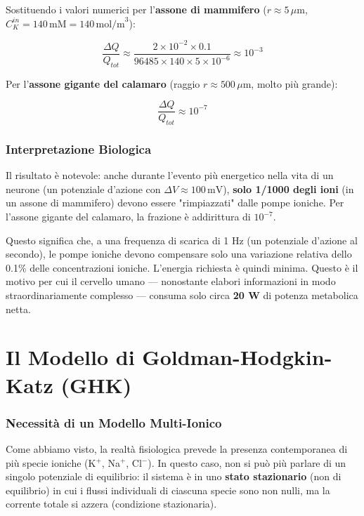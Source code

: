 Sostituendo i valori numerici per l'\textbf{assone di mammifero} ($r \approx 5\,\mu\text{m}$, $C_K^{in} = 140\,\text{mM} = 140\,\text{mol/m}^3$):

\begin{equation}
\frac{\Delta Q}{Q_{tot}} \approx \frac{2 \times 10^{-2} \times 0.1}{96485 \times 140 \times 5 \times 10^{-6}} \approx 10^{-3}
\end{equation}

Per l'\textbf{assone gigante del calamaro} (raggio $r \approx 500\,\mu\text{m}$, molto più grande):

\begin{equation}
\frac{\Delta Q}{Q_{tot}} \approx 10^{-7}
\end{equation}

\subsubsection{Interpretazione Biologica}

Il risultato è notevole: anche durante l'evento più energetico nella vita di un neurone (un potenziale d'azione con $\Delta V \approx 100\,\text{mV}$), \textbf{solo 1/1000 degli ioni} (in un assone di mammifero) devono essere "rimpiazzati" dalle pompe ioniche. Per l'assone gigante del calamaro, la frazione è addirittura di $10^{-7}$.

Questo significa che, a una frequenza di scarica di 1 Hz (un potenziale d'azione al secondo), le pompe ioniche devono compensare solo una variazione relativa dello 0.1\% delle concentrazioni ioniche. L'energia richiesta è quindi minima. Questo è il motivo per cui il cervello umano — nonostante elabori informazioni in modo straordinariamente complesso — consuma solo circa \textbf{20 W} di potenza metabolica netta.


\section{Il Modello di Goldman-Hodgkin-Katz (GHK)}

\subsubsection{Necessità di un Modello Multi-Ionico}

Come abbiamo visto, la realtà fisiologica prevede la presenza contemporanea di più specie ioniche (K$^+$, Na$^+$, Cl$^-$). In questo caso, non si può più parlare di un singolo potenziale di equilibrio: il sistema è in uno \textbf{stato stazionario} (non di equilibrio) in cui i flussi individuali di ciascuna specie sono non nulli, ma la corrente totale si azzera (condizione stazionaria).

